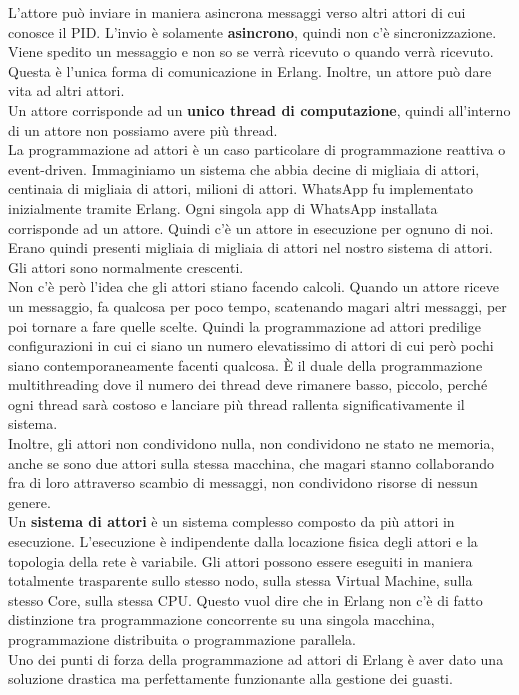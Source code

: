 \documentclass{article}
\begin{document}
L'attore può inviare in maniera asincrona messaggi verso altri attori di cui conosce il PID. L'invio è solamente \textbf{asincrono}, quindi non c'è sincronizzazione. Viene spedito un messaggio e non so se verrà ricevuto o quando verrà ricevuto. Questa è l'unica forma di comunicazione in Erlang. Inoltre, un attore può dare vita ad altri attori.\vspace{14pt}\\
Un attore corrisponde ad un \textbf{unico thread di computazione}, quindi all'interno di un attore non possiamo avere più thread.\\
La programmazione ad attori è un caso particolare di programmazione reattiva o event-driven. Immaginiamo un sistema che abbia decine di migliaia di attori, centinaia di migliaia di attori, milioni di attori. WhatsApp fu implementato inizialmente tramite Erlang. Ogni singola app di WhatsApp installata corrisponde ad un attore. Quindi c'è un attore in esecuzione per ognuno di noi. Erano quindi presenti migliaia di migliaia di attori nel nostro sistema di attori. Gli attori sono normalmente crescenti.\vspace{14pt}\\
Non c'è però l'idea che gli attori stiano facendo calcoli. Quando un attore riceve un messaggio, fa qualcosa per poco tempo, scatenando magari altri messaggi, per poi tornare a fare quelle scelte. Quindi la programmazione ad attori predilige configurazioni in cui ci siano un numero elevatissimo di attori di cui però pochi siano contemporaneamente facenti qualcosa. È il duale della programmazione multithreading dove il numero dei thread deve rimanere basso, piccolo, perché ogni thread sarà costoso e lanciare più thread rallenta significativamente il sistema.\vspace{14pt}\\
Inoltre, gli attori non condividono nulla, non condividono ne stato ne memoria, anche se sono due attori sulla stessa macchina, che magari stanno collaborando fra di loro attraverso scambio di messaggi, non condividono risorse di nessun genere.\vspace{14pt}\\
Un \textbf{sistema di attori} è un sistema complesso composto da più attori in esecuzione. L'esecuzione è indipendente dalla locazione fisica degli attori e la topologia della rete è variabile. Gli attori possono essere eseguiti in maniera totalmente trasparente sullo stesso nodo, sulla stessa Virtual Machine, sulla stesso Core, sulla stessa CPU. Questo vuol dire che in Erlang non c'è di fatto distinzione tra programmazione concorrente su una singola macchina, programmazione distribuita o programmazione parallela.\\
Uno dei punti di forza della programmazione ad attori di Erlang è aver dato una soluzione drastica ma perfettamente funzionante alla gestione dei guasti.
\end{document}
